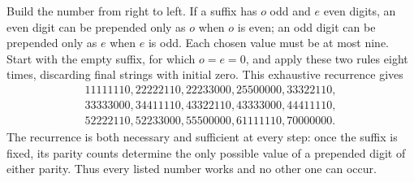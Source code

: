 Build the number from right to left. If a suffix has $o$ odd and $e$ even digits, an even digit can be prepended only as $o$ when $o$ is even; an odd digit can be prepended only as $e$ when $e$ is odd. Each chosen value must be at most nine. Start with the empty suffix, for which $o=e=0$, and apply these two rules eight times, discarding final strings with initial zero. This exhaustive recurrence gives
\[\boxed{\begin{gathered}11111110,22222110,22233000,25500000,33322110,\\33333000,34411110,43322110,43333000,44411110,\\52222110,52233000,55500000,61111110,70000000.\end{gathered}}\]
The recurrence is both necessary and sufficient at every step: once the suffix is fixed, its parity counts determine the only possible value of a prepended digit of either parity. Thus every listed number works and no other one can occur.
